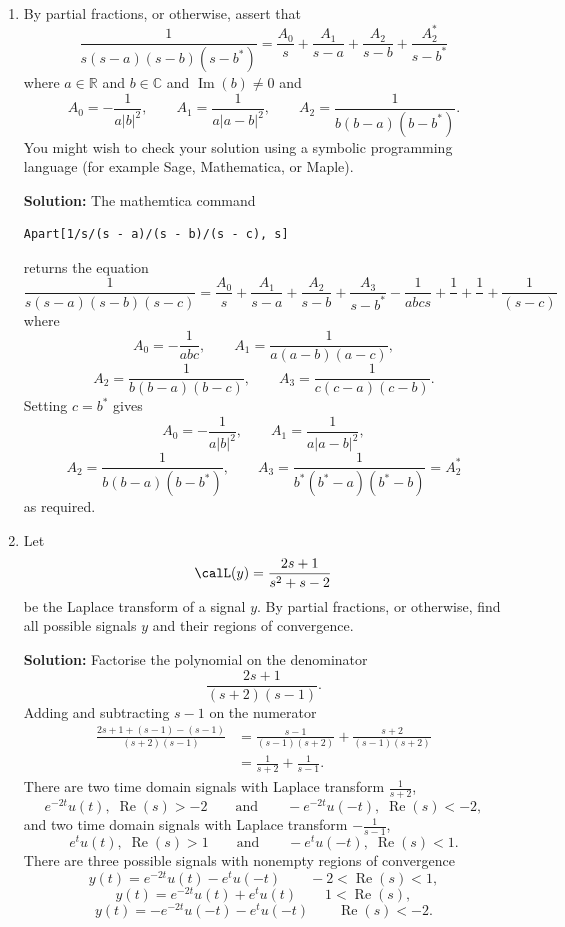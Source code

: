 \documentclass[11pt,a4paper]{book}
\theoremstyle{plain}
\numberwithin{equation}{section}
\newcommand{\reals}{{\mathbb R}}
\newcommand{\complex}{{\mathbb C}}
\renewcommand{\Re}{\operatorname{Re}}
\renewcommand{\Im}{\operatorname{Im}}
\newcommand{\sabs}[1]{\vert #1 \vert}
\newenvironment{solution}{\begin{footnotesize}\textbf{Solution:}}{\end{footnotesize}}
\newenvironment{excersizelist}{%
  \renewcommand*{\theenumi}{\thechapter.\arabic{enumi}}%
  \newcommand\itemadvanced{\stepcounter{enumi}\item[$\ast$\, \theenumi.]}
  \begin{enumerate}
}{%
  \end{enumerate}
}
\begin{document}
\begin{excersizelist}
\item \label{exer:partialfracfourthorder} By partial fractions, or otherwise, assert that
\[
\frac{1}{s(s-a)(s-b)(s-b^*)} = \frac{A_0}{s} + \frac{A_1}{s-a} + \frac{A_2}{s-b} + \frac{A_2^*}{s-b^*}
\]
where $a \in \reals$ and $b \in \complex$ and $\Im(b) \neq 0$ and
\[
A_0 = -\frac{1}{a\sabs{b}^2}, \qquad A_1 =  \frac{1}{a\sabs{a - b}^2}, \qquad A_2 = \frac{1}{b(b-a)(b-b^*)}.
\]
You might wish to check your solution using a symbolic programming language (for example Sage, Mathematica, or Maple).
\begin{solution}
The mathemtica command
\begin{verbatim}
Apart[1/s/(s - a)/(s - b)/(s - c), s]
\end{verbatim}
returns the equation
\[
\frac{1}{s(s-a)(s-b)(s-c)} = \frac{A_0}{s} + \frac{A_1}{s-a} + \frac{A_2}{s-b} + \frac{A_3}{s-b^*} -\frac{1}{a b c s}+\frac{1}{}+\frac{1}{}+\frac{1}{ (s-c)}
\]
where
\[
A_0 = -\frac{1}{abc}, \qquad A_1 =  \frac{1}{a (a-b) (a-c)}, 
\]
\[
A_2 = \frac{1}{b (b-a) (b-c)}, \qquad A_3 = \frac{1}{c (c-a) (c-b)}.
\]
Setting $c = b^*$ gives
\[
A_0 = -\frac{1}{a\sabs{b}^2}, \qquad A_1 =  \frac{1}{a\sabs{a - b}^2}, 
\]
\[ 
A_2 = \frac{1}{b(b-a)(b-b^*)}, \qquad A_3 = \frac{1}{b^*(b^*-a)(b^*-b)} = A_2^*
\]
as required.
\end{solution}


\item Let
\[
\calL(y) = \frac{2s + 1}{s^2 + s - 2}
\]
be the Laplace transform of a signal $y$.  By partial fractions, or otherwise, find all possible signals $y$ and their regions of convergence. 
\begin{solution}
Factorise the polynomial on the denominator
\[
\frac{2s + 1}{(s+2)(s-1)}.
\]
Adding and subtracting $s-1$ on the numerator 
\begin{align*}
\frac{2s + 1 + (s-1) - (s-1)}{(s+2)(s-1)} &= \frac{s-1}{(s-1)(s+2)} + \frac{s+2}{(s-1)(s+2)} \\
&= \frac{1}{s+2} + \frac{1}{s-1}.
\end{align*}
There are two time domain signals with Laplace transform $\frac{1}{s+2}$,
\[
e^{-2t} u(t), \; \Re(s) > -2 \qquad \text{and} \qquad -e^{-2t}u(-t), \; \Re(s) < -2,
\] 
and two time domain signals with Laplace transform $-\frac{1}{s-1}$,
 \[
e^{t}u(t), \; \Re(s) > 1 \qquad \text{and} \qquad -e^{t} u(-t), \; \Re(s) < 1.
\] 
There are three possible signals with nonempty regions of convergence
\[
y(t) = e^{-2t} u(t) - e^{t} u(-t) \qquad -2 < \Re(s) < 1,
\]
\[
y(t) = e^{-2t} u(t) + e^{t} u(t) \qquad 1 < \Re(s),
\]
\[
y(t) = - e^{-2t} u(-t) - e^{t} u(-t) \qquad \Re(s) < -2.
\]
\end{solution}


\end{excersizelist}
\end{document}

